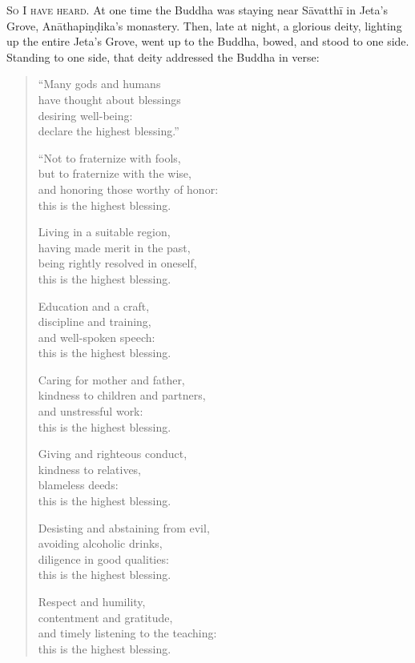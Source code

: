 \documentclass[12pt,openany]{book}%
\newcommand*{\scevam}[1]{\textsc{#1}}
\begin{document}
\scevam{So I have heard. }At one time the Buddha was staying near \textsanskrit{Sāvatthī} in Jeta’s Grove, \textsanskrit{Anāthapiṇḍika}’s monastery. Then, late at night, a glorious deity, lighting up the entire Jeta’s Grove, went up to the Buddha, bowed, and stood to one side. Standing to one side, that deity addressed the Buddha in verse: 

\begin{verse}%
“Many gods and humans \\
have thought about blessings \\
desiring well-being: \\
declare the highest blessing.” 

“Not to fraternize with fools, \\
but to fraternize with the wise, \\
and honoring those worthy of honor: \\
this is the highest blessing. 

Living in a suitable region, \\
having made merit in the past, \\
being rightly resolved in oneself, \\
this is the highest blessing. 

Education and a craft, \\
discipline and training, \\
and well-spoken speech: \\
this is the highest blessing. 

Caring for mother and father, \\
kindness to children and partners, \\
and unstressful work: \\
this is the highest blessing. 

Giving and righteous conduct, \\
kindness to relatives, \\
blameless deeds: \\
this is the highest blessing. 

Desisting and abstaining from evil, \\
avoiding alcoholic drinks, \\
diligence in good qualities: \\
this is the highest blessing. 

Respect and humility, \\
contentment and gratitude, \\
and timely listening to the teaching: \\
this is the highest blessing. 


\end{verse}
\end{document}
